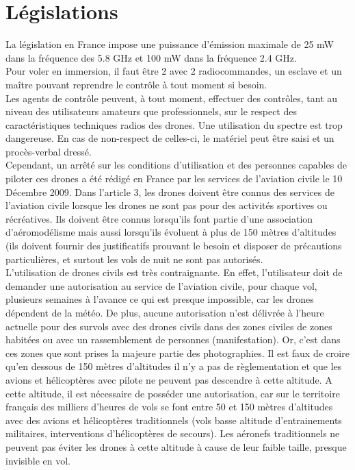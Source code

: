 \section{Législations}



La législation en France impose une puissance d’émission maximale de 25 mW dans la fréquence des 5.8 GHz et 100 mW dans la fréquence 2.4 GHz. ~\\

Pour voler en immersion, il faut être 2 avec 2 radiocommandes, un \og esclave\fg{} et un \og maître\fg{} pouvant reprendre le contrôle à tout moment si besoin. ~\\

Les agents de contrôle peuvent, à tout moment, effectuer des contrôles, tant au niveau des utilisateurs amateurs que professionnels, sur le respect des caractéristiques techniques radios des drones. Une utilisation du spectre est trop dangereuse. En cas de non-respect de celles-ci, le matériel peut être saisi et un procès-verbal dressé.~\\ 

Cependant, un arrêté sur les conditions d’utilisation et des personnes capables de  piloter ces drones a été rédigé en France par les services de l’aviation civile le 10 Décembre 2009. Dans l’article 3, les drones doivent être connus des services de l’aviation civile lorsque les drones ne sont pas pour des activités sportives ou récréatives. Ils doivent être connus lorsqu’ils font partie d’une association d’aéromodélisme mais aussi lorsqu’ils évoluent à plus de 150 mètres d’altitudes (ils doivent fournir des justificatifs prouvant le besoin et disposer de précautions particulières, et surtout les vols de nuit ne sont pas autorisés. ~\\

L’utilisation de drones civils est très contraignante. En effet, l’utilisateur doit de demander une autorisation au service de l’aviation civile, pour chaque vol, plusieurs semaines à l’avance ce qui est presque impossible, car les drones dépendent de la météo. De plus, aucune autorisation n’est délivrée à l’heure actuelle pour des survols avec des drones civils dans des zones civiles de zones habitées ou avec un rassemblement de personnes (manifestation). Or, c’est dans ces zones que sont prises la majeure partie des photographies. Il est faux de croire qu’en dessous de 150 mètres d’altitudes il n’y a pas de règlementation et que les avions et hélicoptères avec pilote ne peuvent pas descendre à cette altitude. A cette altitude, il est nécessaire de posséder une autorisation, car sur le territoire français des milliers d’heures de vols se font entre 50 et 150 mètres d’altitudes avec des avions et hélicoptères traditionnels (vols basse altitude d’entrainements militaires, interventions d’hélicoptères de secours).  Les aéronefs traditionnels  ne peuvent pas éviter les drones à cette altitude à cause de leur faible taille, presque invisible en vol. 



